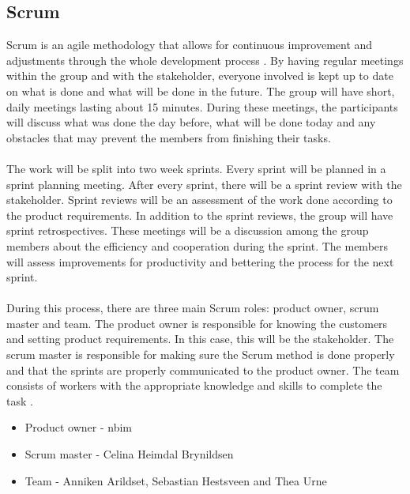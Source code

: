 \subsection{Scrum}
Scrum is an agile methodology that allows for continuous improvement and adjustments through the whole development process \cite{scrum}. By having regular meetings within the group and with the stakeholder, everyone involved is kept up to date on what is done and what will be done in the future. The group will have short, daily meetings lasting about 15 minutes. During these meetings, the participants will discuss what was done the day before, what will be done today and any obstacles that may prevent the members from finishing their tasks. 
\\~\\
The work will be split into two week sprints. Every sprint will be planned in a sprint planning meeting. After every sprint, there will be a sprint review with the stakeholder. Sprint reviews will be an assessment of the work done according to the product requirements. In addition to the sprint reviews, the group will have sprint retrospectives. These meetings will be a discussion among the group members about the efficiency and cooperation during the sprint. The members will assess improvements for productivity and bettering the process for the next sprint.
\\~\\
During this process, there are three main Scrum roles: product owner, scrum master and team. The product owner is responsible for knowing the customers and setting product requirements. In this case, this will be the stakeholder. The scrum master is responsible for making sure the Scrum method is done properly and that the sprints are properly communicated to the product owner. The team consists of workers with the appropriate knowledge and skills to complete the task \cite{scrumroles}.
\\
\begin{itemize}
    \item Product owner - \acrshort{nbim}
    \item Scrum master - Celina Heimdal Brynildsen
    \item Team - Anniken Arildset, Sebastian Hestsveen and Thea Urne
\end{itemize}

